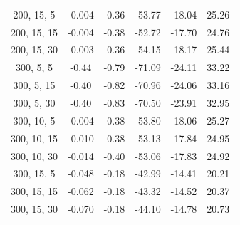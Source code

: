 \documentclass[
]{article}
\begin{document}
\begin{table}[H]
{\begin{tabular}{|c|c|c|c|c|c|}
                200, 15, 5                 & -0.004                     & -0.36                      & -53.77                     & -18.04                   & 25.26                   \\
                200, 15, 15                & -0.004                     & -0.38                      & -52.72                     & -17.70                   & 24.76                   \\
                200, 15, 30                & -0.003                     & -0.36                      & -54.15                     & -18.17                   & 25.44                   \\
                300, 5, 5                  & -0.44                      & -0.79                      & -71.09                     & -24.11                   & 33.22                   \\
                300, 5, 15                 & -0.40                      & -0.82                      & -70.96                     & -24.06                   & 33.16                   \\
                300, 5, 30                 & -0.40                      & -0.83                      & -70.50                     & -23.91                   & 32.95                   \\
                300, 10, 5                 & -0.004                     & -0.38                      & -53.80                     & -18.06                   & 25.27                   \\
                300, 10, 15                & -0.010                     & -0.38                      & -53.13                     & -17.84                   & 24.95                   \\
                300, 10, 30                & -0.014                     & -0.40                      & -53.06                     & -17.83                   & 24.92                   \\
                300, 15, 5                 & -0.048                     & -0.18                      & -42.99                     & -14.41                   & 20.21                   \\
                300, 15, 15                & -0.062                     & -0.18                      & -43.32                     & -14.52                   & 20.37                   \\
                300, 15, 30                & -0.070                     & -0.18                      & -44.10                     & -14.78                   & 20.73                   \\

\end{tabular}}
\end{table}
\end{document}
